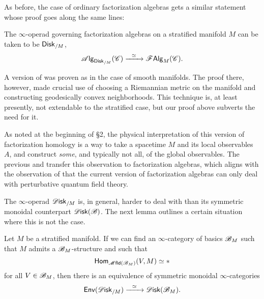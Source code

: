 \documentclass[../text]{subfiles}
\begin{document}
As before, the case of ordinary factorization algebras gets a similar statement whose proof goes along the same lines:

\begin{corollary}\label{cor:disk_alg=falg}
    The $\infty$-operad governing factorization algebras on a stratified manifold $M$ can be taken to be $\disk[r]_{/M}$,
    \begin{equation}
        \alg{\disk[r]_{/M}} (\catC) \xrightarrow{\ \ \simeq \ \ } \falg_M (\catC).
    \end{equation}
\end{corollary}

\begin{remark}
    A version of  was proven as \cite[thm.6]{gtz2014} in the case of smooth manifolds. The proof there, however, made crucial use of choosing a Riemannian metric on the manifold and constructing geodesically convex neighborhoods. This technique is, at least presently, not extendable to the stratified case, but our proof above subverts the need for it. 
\end{remark}

\begin{remark}
    As noted at the beginning of \S 2, the physical interpretation of this version of factorization homology is a way to take a spacetime $M$ and its local observables $A$, and construct \emph{some}, and typically not all, of the global observables. The previous  and  transfer this observation to factorization algebras, which aligns with the observation of \cite{cg2016} that the current version of factorization algebras can only deal with perturbative quantum field theory. 
\end{remark}

The $\infty$-operad $\disk_{/M}$ is, in general, harder to deal with than its symmetric monoidal counterpart $\disk(\bstr)$. The next lemma outlines a certain situation where this is not the case.

\begin{lemma}\label{lem:disk/M_to_disk}
    Let $M$ be a stratified manifold. If we can find an $\infty$-category of basics $\mathscr{B}_M$ such that $M$ admits a $\mathscr{B}_M$-structure and such that
    \begin{equation}
        \mathsf{Hom}_{\mfld(\bstr_M)} (V, M) \simeq *
    \end{equation}
    for all $V \in \mathscr{B}_M$, then there is an equivalence of symmetric monoidal $\infty$-categories
    \begin{equation}
        \mathsf{Env}(\disk_{/M}) \xrightarrow{\ \ \simeq \ \ } \disk(\bstr_M).
    \end{equation}
\end{lemma}
\end{document}

